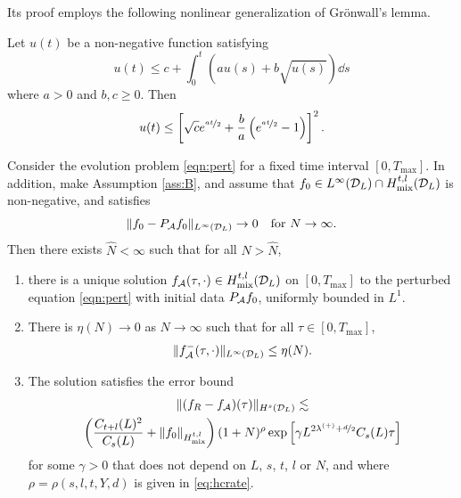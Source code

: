 Its proof employs the following nonlinear generalization of Grönwall's lemma.
\begin{lemma} \label{lem:gron}
    Let $u(t)$ be a non-negative function satisfying
    \[
        u(t) \leq c + \int_0^t\left(au(s)+b\sqrt{u(s)}\right)\dd s
    \]
    where $a>0$ and $b,c\geq0$. Then
    \[
        u(t) \leq \left[\sqrt{c}e^{\nicefrac{at}{2}} + 
                \frac{b}{a}\left(e^{\nicefrac{at}{2}}-1\right)\right]^2.
    \]
\end{lemma}

\begin{theorem} \label{thm:discrerror} Consider the evolution problem
  \eqref{eqn:pert} for a fixed time interval $[0,T_\mathrm{max}]$. In addition, make
  Assumption \ref{ass:B}, and assume that $f_0\in L^\infty(\mathcal{D}_L) \cap
  {H}^{t,l}_\mathrm{mix}(\mathcal{D}_L)$ is non-negative, and satisfies
  $$
  \|f_0-P_{\mathcal{A}} f_0\|_{L^\infty(\mathcal{D}_L)} \to 0\quad \text{for } N\to\infty.
  $$
  Then there exists $\hat{N} < \infty$ such that for all $N>\hat{N}$,
    \begin{enumerate}
    \renewcommand{\labelenumi}{(\roman{enumi})}
    \item there is a unique solution $f_{\mathcal{A}}(\tau,\cdot)\in {H}^{t,l}_\mathrm{mix}(\mathcal{D}_L)$ on
    $[0,T_\mathrm{max}]$ to the perturbed equation \eqref{eqn:pert} with initial data $P_{\mathcal{A}} f_0$, uniformly
    bounded in $L^1$.
    \item There is $\eta(N)\to0$ as $N\to\infty$ such that for all $\tau\in[0,T_\mathrm{max}]$,
    \[
        \|f_{\mathcal{A}}^{-}(\tau,\cdot)\|_{L^\infty(\mathcal{D}_L)} \leq \eta(N).
    \]
    \item The solution satisfies the error bound
    \begin{multline*}
        \|(f_R-f_{\mathcal{A}})(\tau)\|_{H^s(\mathcal{D}_L)} \lesssim \\ \left(
        \frac{C_{t+l}(L)^2}{C_s(L)} +
        \|f_0\|_{{H}^{t,l}_\mathrm{mix}}\right)
        (1+N)^{\rho} \exp\left[\gamma L^{2\lambda^{(+)}+\nicefrac{d}{2}}C_s(L)\tau\right]
    \end{multline*}
    for some $\gamma>0$ that does not depend on $L$, $s$, $t$, $l$ or $N$, and
    where $\rho=\rho(s,l,t,Y,d)$ is given in \eqref{eq:hcrate}.
    \end{enumerate}
\end{theorem}
